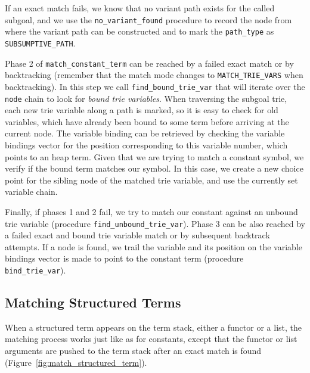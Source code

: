 If an exact match fails, we know that no variant path exists for the called subgoal, and we use the
\texttt{no\_variant\_found} procedure to record the node from where the variant path can be
constructed and to mark the \texttt{path\_type} as \texttt{SUBSUMPTIVE\_PATH}.

Phase 2 of \texttt{match\_constant\_term} can be reached by a failed exact match or by backtracking
(remember that the match mode changes to \texttt{MATCH\_TRIE\_VARS} when backtracking). In this step
we call \texttt{find\_bound\_trie\_var} that will iterate over the \texttt{node} chain to look for
\textit{bound trie variables}. When traversing the subgoal trie, each new trie variable
along a path is marked, so it is easy to check for old variables, which have already been bound
to some term before arriving at the current node. The variable binding can be retrieved by
checking the variable bindings vector for the position corresponding to this variable
number, which points to an heap term. Given that we are trying to match a constant symbol,
we verify if the bound term matches our symbol. In this case, we create a new choice point
for the sibling node of the matched trie variable, and use the currently set variable chain.

Finally, if phases 1 and 2 fail, we try to match our constant against an unbound trie variable
(procedure \texttt{find\_unbound\_trie\_var}).
Phase 3 can be also reached by a failed exact and bound trie variable match or by subsequent backtrack
attempts. If a node is found, we trail the variable and its position on the variable bindings
vector is made to point to the constant term (procedure \texttt{bind\_trie\_var}).

\subsection{Matching Structured Terms}

When a structured term appears on the term stack, either a functor or a list, the matching
process works just like as for constants, except that the functor or list arguments are
pushed to the term stack after an exact match is found (Figure~\ref{fig:match_structured_term}).

